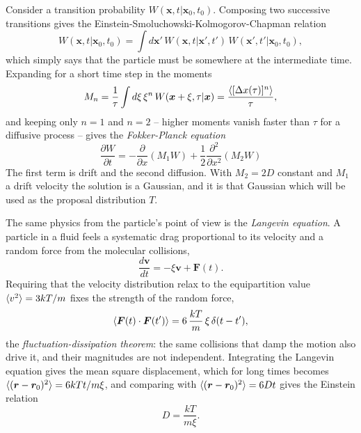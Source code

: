 Consider a transition probability $W(\bm{x},t|\bm{x}_0,t_0)$.  Composing two
successive transitions gives the Einstein-Smoluchowski-Kolmogorov-Chapman
relation
\begin{equation}
  W(\bm{x},t|\bm{x}_0,t_0)
   = \int d\bm{x}'\,W(\bm{x},t|\bm{x}',t')\,W(\bm{x}',t'|\bm{x}_0,t_0),
  \label{eq:12-eskc}
\end{equation}
which simply says that the particle must be somewhere at the intermediate
time.  Expanding for a short time step in the moments
\begin{equation}
  M_n = \frac{1}{\tau}\int d\xi\,\xi^n\,W(\bm{x}+\xi,\tau|\bm{x})
      = \frac{\langle [\Delta x(\tau)]^n \rangle}{\tau},
  \label{eq:12-moments}
\end{equation}
and keeping only $n=1$ and $n=2$ -- higher moments vanish faster than $\tau$
for a diffusive process -- gives the \emph{Fokker-Planck equation}
\begin{equation}
  \boxed{\;
  \frac{\partial W}{\partial t}
   = -\frac{\partial}{\partial x}\left(M_1 W\right)
   + \frac{1}{2}\frac{\partial^2}{\partial x^2}\left(M_2 W\right) \;}
  \label{eq:12-fokkerplanck}
\end{equation}
The first term is drift and the second diffusion.  With $M_2=2D$ constant and
$M_1$ a drift velocity the solution is a Gaussian, and it is that Gaussian
which will be used as the proposal distribution $T$.

The same physics from the particle's point of view is the \emph{Langevin
equation}.  A particle in a fluid feels a systematic drag proportional to its
velocity and a random force from the molecular collisions,
\begin{equation}
  \frac{d\bm{v}}{dt} = -\xi\bm{v} + \bm{F}(t).
  \label{eq:12-langevin}
\end{equation}
Requiring that the velocity distribution relax to the equipartition value
$\langle v^2 \rangle=3kT/m$ fixes the strength of the random force,
\begin{equation}
  \langle \bm{F}(t)\cdot\bm{F}(t') \rangle
   = 6\,\frac{kT}{m}\,\xi\,\delta(t-t'),
  \label{eq:12-fluctuationdissipation}
\end{equation}
the \emph{fluctuation-dissipation theorem}: the same collisions that damp the
motion also drive it, and their magnitudes are not independent.  Integrating
the Langevin equation gives the mean square displacement, which for long times
becomes $\langle (\bm{r}-\bm{r}_0)^2 \rangle=6kTt/m\xi$, and comparing with
$\langle (\bm{r}-\bm{r}_0)^2 \rangle=6Dt$ gives the Einstein relation
\begin{equation}
  D = \frac{kT}{m\xi}.
  \label{eq:12-einstein}
\end{equation}

